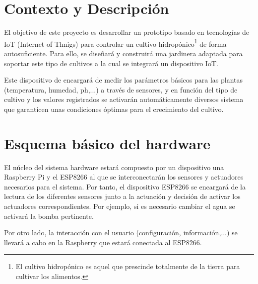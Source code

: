 \documentclass[12pt,a4paper,titlepage,oneside]{report}
\title{\titulo}
\author{\autor}
\begin{document}



\tableofcontents
\listoffigures

\chapter{Contexto y Descripción}
	El objetivo de este proyecto es desarrollar un prototipo basado en tecnologías de IoT (Internet of Thnigs) para controlar un cultivo hidropónico\footnote[1]{El cultivo hidropónico es aquel que prescinde totalmente de la tierra para cultivar los alimentos.} de forma autosuficiente. Para ello, se diseñará y construirá una jardinera adaptada para soportar este tipo de cultivos a la cual se integrará un  dispositivo IoT. 


	Este dispositivo de encargará de medir los parámetros básicos para las plantas (temperatura, humedad, ph,...) a través de sensores, y en función del tipo de cultivo y los valores registrados se activarán automáticamente diversos sistema que garanticen unas condiciones óptimas para el crecimiento del cultivo.



\chapter{Esquema básico del hardware}

	El núcleo del sistema hardware estará compuesto por un dispositivo una Raspberry Pi y el ESP8266 al que se interconectarán los sensores y actuadores necesarios para el sistema. Por tanto, el dispositivo ESP8266 se encargará de la lectura de los diferentes sensores junto a la actuación y decisión de activar los actuadores correspondientes. Por ejemplo, si es necesario cambiar el agua se activará la bomba pertinente.

	Por otro lado, la interacción con el usuario (configuración, información,...) se llevará a cabo en la Raspberry que estará conectada al ESP8266. 
	
\end{document}
